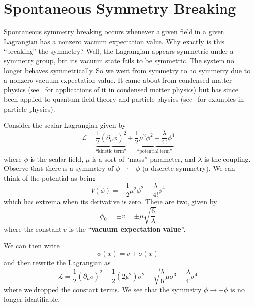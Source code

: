 
\section{Spontaneous Symmetry Breaking}

Spontaneous symmetry breaking occurs whenever a given field in a given
Lagrangian has a nonzero vacuum expectation value. Why exactly is this
``breaking'' the symmetry? Well, the Lagrangian appears symmetric
under a symmetry group, but its vacuum state fails to be
symmetric. The system no longer behaves symmetrically. So we went from
symmetry to no symmetry due to a nonzero vacuum expectation value. It
came about from condensed matter physics (see~\cite{wen} for
applications of it in condensed matter physics) but has
since been applied to quantum field theory and particle physics
(see~\cite{peskinSchroeder} for examples in particle physics).

Consider the scalar Lagrangian given by
\begin{equation}
\mathcal{L} =
\underbrace{\frac{1}{2}(\partial_{\mu}\phi)^2}_{\text{``kinetic term''}} +
\underbrace{\frac{1}{2}\mu^{2}\phi^{2} -
  \frac{\lambda}{4!}\phi^{4}}_{\text{``potential term''}}
\end{equation}
where $\phi$ is the scalar field, $\mu$ is a sort of ``mass''
parameter, and $\lambda$ is the coupling. Observe that there is a
symmetry of $\phi\to-\phi$ (a discrete symmetry).  We can think of the
potential as being
\begin{equation}
V(\phi) = -\frac{1}{2}\mu^{2}\phi^2 + \frac{\lambda}{4!}\phi^{4}
\end{equation}
which has extrema when its derivative is zero. There are two, given by
\begin{equation}
\phi_{0} = \pm v = \pm \mu\sqrt{\frac{6}{\lambda}}
\end{equation}
where the constant $v$ is the ``\textbf{vacuum expectation value}''.

We can then write
\begin{equation}
\phi(x) = v + \sigma(x)
\end{equation}
and then rewrite the Lagrangian as
\begin{equation}
\mathcal{L} = \frac{1}{2}(\partial_{\mu}\sigma)^{2} -
\frac{1}{2}(2\mu^2)\sigma^2 - \sqrt{\frac{\lambda}{6}}\mu\sigma^3 -
\frac{\lambda}{4!}\sigma^{4}
\end{equation}
where we dropped the constant terms. We see that the symmetry
$\phi\to-\phi$ is no longer identifiable. 
